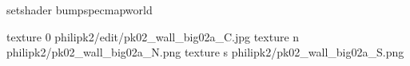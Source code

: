 setshader bumpspecmapworld

texture 0 philipk2/edit/pk02_wall_big02a_C.jpg
texture n philipk2/pk02_wall_big02a_N.png
texture s philipk2/pk02_wall_big02a_S.png

